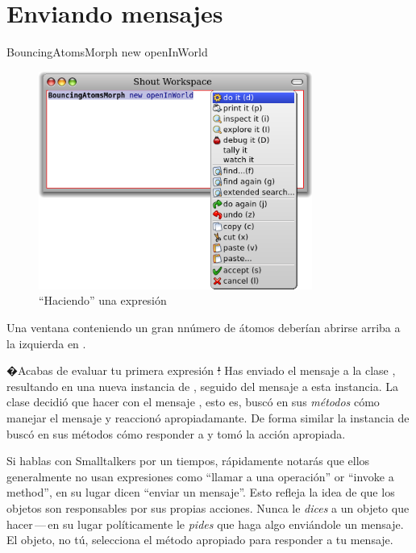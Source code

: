 \documentclass[a4paper,10pt,twoside]{book}
\begin{document}
\section{Enviando mensajes}


\begin{code}{}
BouncingAtomsMorph new openInWorld
\end{code}


\begin{figure}[htb]
\centerline {\includegraphics[width=0.8\textwidth]{Doit}}
\caption{``Haciendo'' una expresi\'on}
\end{figure}

Una ventana conteniendo un gran nn\'umero de \'atomos deber\'ian abrirse arriba a la izquierda en \pharo.

�Acabas de evaluar tu primera expresi\'on \st!
Has enviado el mensaje  a la clase \bam, resultando en una nueva instancia de \bam, seguido del mensaje  a esta instancia.
La clase \bam decidi\'o que hacer con el mensaje , esto es, busc\'o en sus \emph{m\'etodos} c\'omo manejar el mensaje  y reaccion\'o apropiadamante.
De forma similar la instancia de \bam busc\'o en sus m\'etodos c\'omo responder a  y tom\'o la acci\'on apropiada.

Si hablas con Smalltalkers por un tiempos, r\'apidamente notar\'as que ellos generalmente no usan expresiones como ``llamar a una operaci\'on'' or ``invoke a method'', en su lugar dicen ``enviar un mensaje''.
Esto refleja la idea de que los objetos son responsables por sus propias acciones. 
Nunca le \emph{dices} a un objeto que hacer\,---\,en su lugar pol\'iticamente le \emph{pides} que haga algo envi\'andole un mensaje.
El objeto, no t\'u, selecciona el m\'etodo apropiado para responder a tu mensaje.
\end{document}
